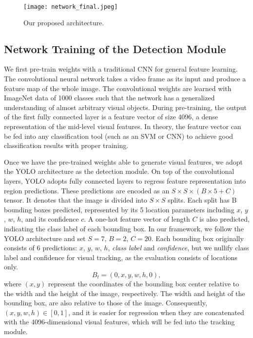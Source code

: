 \documentclass{article}
\begin{document}
\begin{figure}[t] %
	\centering
	\captionsetup{justification=centering}
	\texttt{[image: network\_final.jpeg]}
	\caption{Our proposed architecture.}
	\label{fig-network}
\end{figure}


\subsection{Network Training of the Detection Module}

We first pre-train weights with a traditional CNN for general feature learning. The convolutional neural network takes a video frame as its input and produce a feature map of the whole image.
The convolutional weights are learned with ImageNet data of 1000 classes such that the network has a generalized understanding of almost arbitrary visual objects. During pre-training, the output of the first fully connected layer is a feature vector of size 4096, a dense representation of the mid-level visual features. In theory, the feature vector can be fed into any classification tool (such as an SVM or CNN) to achieve good classification results with proper training.

Once we have the pre-trained weights able to generate visual features, we adopt the YOLO architecture as the detection module. %
On top of the convolutional layers, YOLO adopts fully connected layers to regress feature representation into region predictions.
These predictions are encoded as an $S \times S \times (B \times 5 + C)$ tensor. It denotes that the image is divided into $S \times S$ splits. Each split has B bounding boxes predicted, represented by its 5 location parameters including $x$, $y$, $w$, $h$, and its confidence $c$. A one-hot feature vector of length $C$ is also predicted, indicating the class label of each bounding box. In our framework, we follow the YOLO architecture and set $S = 7$, $B= 2$, $C= 20$.
Each bounding box originally consists of 6 predictions: $x$, $y$, $w$, $h$, \textit{class label} and \textit{confidence}, but we nullify class label and confidence for visual tracking, as the evaluation consists of locations only.
\begin{equation}
B_{t} = (0, x, y, w, h, 0),
\end{equation}
where $(x, y)$ represent the coordinates of the bounding box center relative to the width and the height of the image, respectively. The width and height of the bounding box, are also relative to those of the image. Consequently, $(x, y, w, h) \in [0, 1]$, and it is easier for regression when they are concatenated with the 4096-dimensional visual features, which will be fed into the tracking module.
\end{document}
